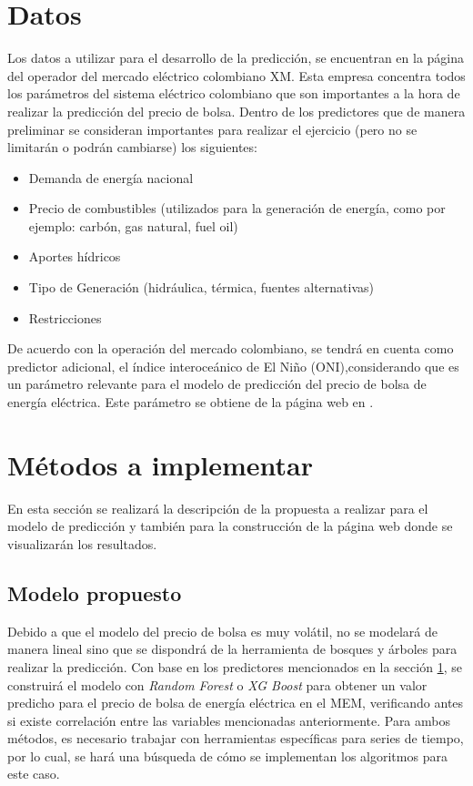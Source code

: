 \documentclass[conference, 10pt]{IEEEtran}
\begin{document}
\section{Datos} \label{sec:data}
Los datos a utilizar para el desarrollo de la predicción, se encuentran en la página del operador del mercado eléctrico colombiano XM. Esta empresa concentra todos los parámetros del sistema eléctrico colombiano que son importantes a la hora de realizar la predicción del precio de bolsa. Dentro de los predictores que de manera preliminar se consideran importantes para realizar el ejercicio (pero no se limitarán o podrán cambiarse) los siguientes:
\begin{itemize}
\item Demanda de energía nacional 
\item Precio de combustibles (utilizados para la generación de energía, como por ejemplo: carbón, gas natural, fuel oil)
\item Aportes hídricos 
\item Tipo de Generación (hidráulica, térmica, fuentes alternativas) 
\item Restricciones
\end{itemize}
De acuerdo con la operación del mercado colombiano, se tendrá en cuenta como predictor adicional, el índice interoceánico de El Niño (ONI),considerando que es un parámetro relevante para el modelo de predicción del precio de bolsa de energía eléctrica. Este parámetro se obtiene de la página web en \cite{b3}. 

\section{Métodos a implementar} \label{sec:meth}
En esta sección se realizará la descripción de la propuesta a realizar para el modelo de predicción y también para la construcción de la página web donde se visualizarán los resultados.
\subsection{Modelo propuesto} \label{sec:prop}
Debido a que el modelo del precio de bolsa es muy volátil, no se modelará de manera lineal sino que se dispondrá de la herramienta de bosques y árboles para realizar la predicción. Con base en los predictores mencionados en la sección \ref{sec:data}, se construirá el modelo con \textit{Random Forest} o \textit{XG Boost} para obtener un valor predicho para el precio de bolsa de energía eléctrica en el MEM, verificando antes si existe correlación entre las variables mencionadas anteriormente. Para ambos métodos, es necesario trabajar con herramientas específicas para series de tiempo, por lo cual, se hará una búsqueda de cómo se implementan los algoritmos para este caso.\
\end{document}
